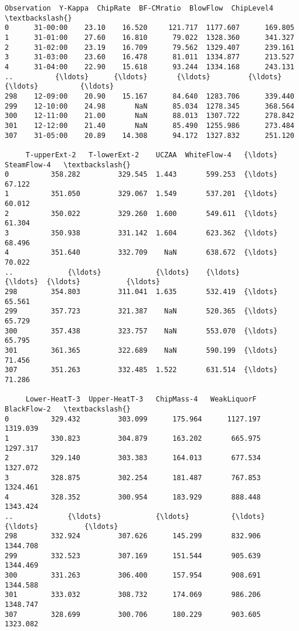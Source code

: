 \documentclass[11pt]{article}
\makeatletter
\newcommand{\boxspacing}{\kern\kvtcb@left@rule\kern\kvtcb@boxsep}
\newcommand{\prompt}[4]{
        {\ttfamily\llap{{\color{#2}[#3]:\hspace{3pt}#4}}\vspace{-\baselineskip}}
    }
\makeatother
\begin{document}
            \begin{tcolorbox}[breakable, size=fbox, boxrule=.5pt, pad at break*=1mm, opacityfill=0]
\prompt{Out}{outcolor}{7}{\boxspacing}
\begin{Verbatim}[commandchars=\\\{\}]
    Observation  Y-Kappa  ChipRate  BF-CMratio  BlowFlow  ChipLevel4   \textbackslash{}
0      31-00:00    23.10    16.520     121.717  1177.607      169.805
1      31-01:00    27.60    16.810      79.022  1328.360      341.327
2      31-02:00    23.19    16.709      79.562  1329.407      239.161
3      31-03:00    23.60    16.478      81.011  1334.877      213.527
4      31-04:00    22.90    15.618      93.244  1334.168      243.131
..          {\ldots}      {\ldots}       {\ldots}         {\ldots}       {\ldots}          {\ldots}
298    12-09:00    20.90    15.167      84.640  1283.706      339.440
299    12-10:00    24.98       NaN      85.034  1278.345      368.564
300    12-11:00    21.00       NaN      88.013  1307.722      278.842
301    12-12:00    21.40       NaN      85.490  1255.986      273.484
307    31-05:00    20.89    14.308      94.172  1327.832      251.120

     T-upperExt-2   T-lowerExt-2    UCZAA  WhiteFlow-4   {\ldots}  SteamFlow-4   \textbackslash{}
0          358.282         329.545  1.443       599.253  {\ldots}        67.122
1          351.050         329.067  1.549       537.201  {\ldots}        60.012
2          350.022         329.260  1.600       549.611  {\ldots}        61.304
3          350.938         331.142  1.604       623.362  {\ldots}        68.496
4          351.640         332.709    NaN       638.672  {\ldots}        70.022
..             {\ldots}             {\ldots}    {\ldots}           {\ldots}  {\ldots}           {\ldots}
298        354.803         311.041  1.635       532.419  {\ldots}        65.561
299        357.723         321.387    NaN       520.365  {\ldots}        65.729
300        357.438         323.757    NaN       553.070  {\ldots}        65.795
301        361.365         322.689    NaN       590.199  {\ldots}        71.456
307        351.263         332.485  1.522       631.514  {\ldots}        71.286

     Lower-HeatT-3  Upper-HeatT-3   ChipMass-4   WeakLiquorF   BlackFlow-2   \textbackslash{}
0          329.432         303.099      175.964      1127.197      1319.039
1          330.823         304.879      163.202       665.975      1297.317
2          329.140         303.383      164.013       677.534      1327.072
3          328.875         302.254      181.487       767.853      1324.461
4          328.352         300.954      183.929       888.448      1343.424
..             {\ldots}             {\ldots}          {\ldots}           {\ldots}           {\ldots}
298        332.924         307.626      145.299       832.906      1344.708
299        332.523         307.169      151.544       905.639      1344.469
300        331.263         306.400      157.954       908.691      1344.588
301        333.032         308.732      174.069       986.206      1348.747
307        328.699         300.706      180.229       903.605      1323.082


\end{Verbatim}
\end{tcolorbox}
\end{document}

